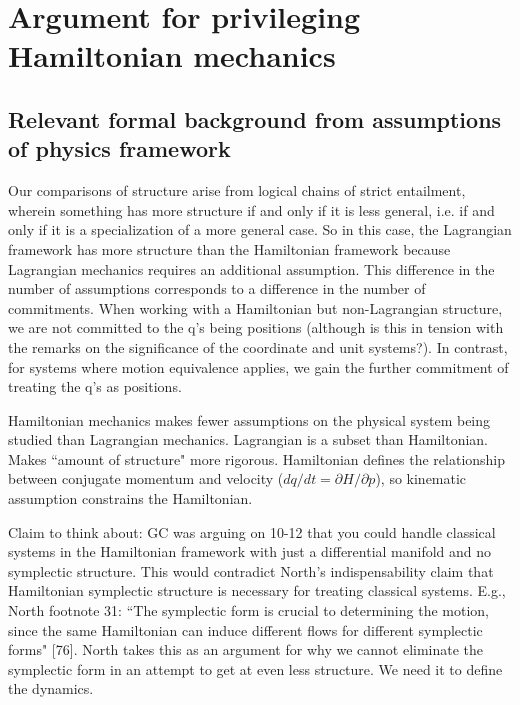 \documentclass[letterpaper]{article}
\begin{document}
\section{Argument for privileging Hamiltonian mechanics}

\subsection{Relevant formal background from assumptions of physics framework}

Our comparisons of structure arise from logical chains of strict entailment, wherein something has more structure if and only if it is less general, i.e. if and only if it is a specialization of a more general case. So in this case, the Lagrangian framework has more structure than the Hamiltonian framework because Lagrangian mechanics requires an additional assumption. This difference in the number of assumptions corresponds to a difference in the number of commitments. When working with a Hamiltonian but non-Lagrangian structure, we are not committed to the q's being positions (although is this in tension with the remarks on the significance of the coordinate and unit systems?). In contrast, for systems where motion equivalence applies, we gain the further commitment of treating the q's as positions.

Hamiltonian mechanics makes fewer assumptions on the physical system being studied than Lagrangian mechanics. Lagrangian is a subset than Hamiltonian. Makes ``amount of structure" more rigorous. Hamiltonian defines the relationship between conjugate momentum and velocity ($dq/dt = \partial H / \partial p$), so kinematic assumption constrains the Hamiltonian.


Claim to think about: GC was arguing on 10-12 that you could handle classical systems in the Hamiltonian framework with just a differential manifold and no symplectic structure. This would contradict North's indispensability claim that Hamiltonian symplectic structure is necessary for treating classical systems. E.g., North footnote 31: ``The symplectic form is crucial to determining the motion, since the same Hamiltonian can induce different flows for different symplectic forms" [76]. North takes this as an argument for why we cannot eliminate the symplectic form in an attempt to get at even less structure. We need it to define the dynamics.
\end{document}
